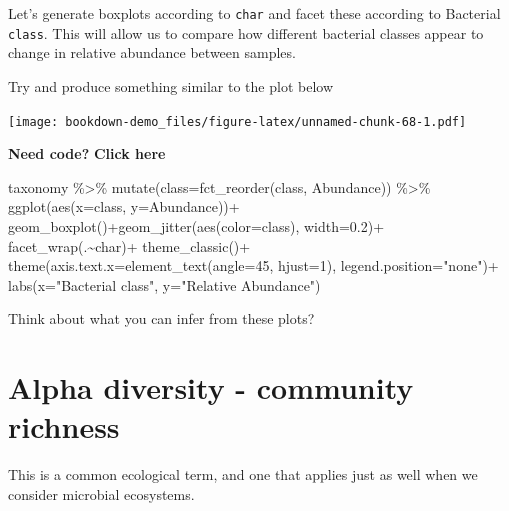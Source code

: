\documentclass[
]{book}
\newenvironment{Shaded}{\begin{snugshade}}{\end{snugshade}}
\newcommand{\AttributeTok}[1]{\textcolor[rgb]{0.77,0.63,0.00}{#1}}
\newcommand{\DecValTok}[1]{\textcolor[rgb]{0.00,0.00,0.81}{#1}}
\newcommand{\FloatTok}[1]{\textcolor[rgb]{0.00,0.00,0.81}{#1}}
\newcommand{\FunctionTok}[1]{\textcolor[rgb]{0.00,0.00,0.00}{#1}}
\newcommand{\NormalTok}[1]{#1}
\newcommand{\SpecialCharTok}[1]{\textcolor[rgb]{0.00,0.00,0.00}{#1}}
\newcommand{\StringTok}[1]{\textcolor[rgb]{0.31,0.60,0.02}{#1}}
\begin{document}
Let's generate boxplots according to \texttt{char} and facet these according to Bacterial \texttt{class}. This will allow us to compare how different bacterial classes appear to change in relative abundance between samples.

Try and produce something similar to the plot below

\texttt{[image: bookdown-demo\_files/figure-latex/unnamed-chunk-68-1.pdf]}

\hypertarget{box}{}
\textbf{Need code?}
\textbf{Click here}

\begin{Shaded}
\begin{Highlighting}[]
\NormalTok{taxonomy }\SpecialCharTok{\%\textgreater{}\%} 
  \FunctionTok{mutate}\NormalTok{(}\AttributeTok{class=}\FunctionTok{fct\_reorder}\NormalTok{(class, Abundance)) }\SpecialCharTok{\%\textgreater{}\%} 
  \FunctionTok{ggplot}\NormalTok{(}\FunctionTok{aes}\NormalTok{(}\AttributeTok{x=}\NormalTok{class, }\AttributeTok{y=}\NormalTok{Abundance))}\SpecialCharTok{+}
  \FunctionTok{geom\_boxplot}\NormalTok{()}\SpecialCharTok{+}\FunctionTok{geom\_jitter}\NormalTok{(}\FunctionTok{aes}\NormalTok{(}\AttributeTok{color=}\NormalTok{class), }\AttributeTok{width=}\FloatTok{0.2}\NormalTok{)}\SpecialCharTok{+}
  \FunctionTok{facet\_wrap}\NormalTok{(.}\SpecialCharTok{\textasciitilde{}}\NormalTok{char)}\SpecialCharTok{+}
  \FunctionTok{theme\_classic}\NormalTok{()}\SpecialCharTok{+}
  \FunctionTok{theme}\NormalTok{(}\AttributeTok{axis.text.x=}\FunctionTok{element\_text}\NormalTok{(}\AttributeTok{angle=}\DecValTok{45}\NormalTok{, }\AttributeTok{hjust=}\DecValTok{1}\NormalTok{), }\AttributeTok{legend.position=}\StringTok{"none"}\NormalTok{)}\SpecialCharTok{+}
  \FunctionTok{labs}\NormalTok{(}\AttributeTok{x=}\StringTok{"Bacterial class"}\NormalTok{, }\AttributeTok{y=}\StringTok{"Relative Abundance"}\NormalTok{)}
\end{Highlighting}
\end{Shaded}

Think about what you can infer from these plots?

\hypertarget{alpha-diversity---community-richness}{%
\section{Alpha diversity - community richness}\label{alpha-diversity---community-richness}}

This is a common ecological term, and one that applies just as well when we consider microbial ecosystems.
\end{document}
